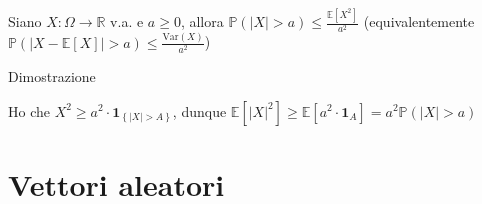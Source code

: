 \documentclass[a4paper,10pt]{article}
\theoremstyle{remark}
\theoremstyle{definition}
\begin{document}
Siano $X:\Omega\longrightarrow\mathbb{R}$ v.a. e $a\geq0$, allora
$\mathbb{P}\left(\left|X\right|>a\right)\leq\frac{\mathbb{E}\left[X^{2}\right]}{a^{2}}$
(equivalentemente $\mathbb{P}\left(\left|X-\mathbb{E}\left[X\right]\right|>a\right)\leq\frac{\text{Var}\left(X\right)}{a^{2}}$)

\subparagraph*{Dimostrazione}

Ho che $X^{2}\geq a^{2}\cdot\boldsymbol{1}_{\left\{ \left|X\right|>A\right\} }$,
dunque $\mathbb{E}\left[\left|X\right|^{2}\right]\geq\mathbb{E}\left[a^{2}\cdot\boldsymbol{1}_{A}\right]=a^{2}\mathbb{P}\left(\left|X\right|>a\right)$




\pagebreak
\part{Vettori aleatori}
\end{document}
